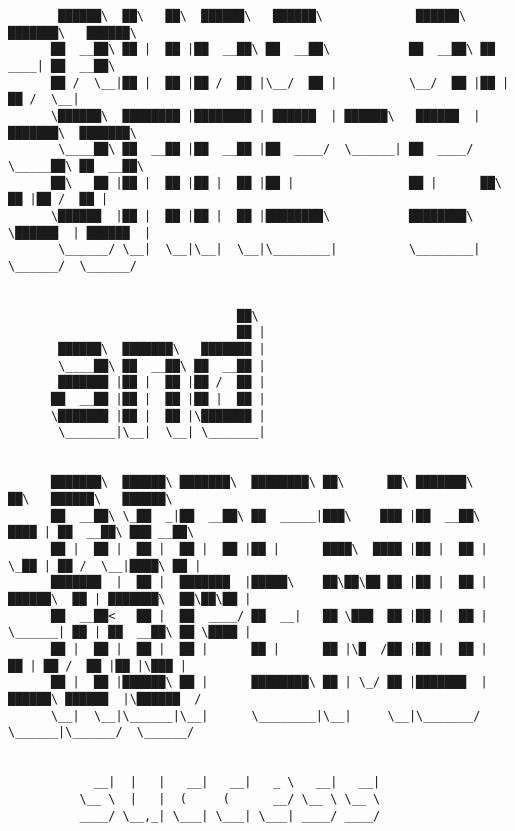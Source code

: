 \documentclass[varwidth=\maxdimen,margin=0.5cm,multi={verbatim}]{standalone}
\begin{document}
\begin{verbatim}
       ██████\  ██\   ██\  ██████\   ██████\             ██████\  ███████\   ██████\
      ██  __██\ ██ |  ██ |██  __██\ ██  __██\           ██  __██\ ██  ____| ██  __██\
      ██ /  \__|██ |  ██ |██ /  ██ |\__/  ██ |          \__/  ██ |██ |      ██ /  \__|
      \██████\  ████████ |████████ | ██████  | ██████\   ██████  |███████\  ███████\
       \____██\ ██  __██ |██  __██ |██  ____/  \______| ██  ____/ \_____██\ ██  __██\
      ██\   ██ |██ |  ██ |██ |  ██ |██ |                ██ |      ██\   ██ |██ /  ██ |
      \██████  |██ |  ██ |██ |  ██ |████████\           ████████\ \██████  | ██████  |
       \______/ \__|  \__|\__|  \__|\________|          \________| \______/  \______/


                                ██\
                                ██ |
       ██████\  ███████\   ███████ |
       \____██\ ██  __██\ ██  __██ |
       ███████ |██ |  ██ |██ /  ██ |
      ██  __██ |██ |  ██ |██ |  ██ |
      \███████ |██ |  ██ |\███████ |
       \_______|\__|  \__| \_______|


      ███████\  ██████\ ███████\  ████████\ ██\      ██\ ███████\            ██\   ██████\   ██████\
      ██  __██\ \_██  _|██  __██\ ██  _____|███\    ███ |██  __██\         ████ | ██  __██\ ███ __██\
      ██ |  ██ |  ██ |  ██ |  ██ |██ |      ████\  ████ |██ |  ██ |        \_██ | ██ /  \__|████\ ██ |
      ███████  |  ██ |  ███████  |█████\    ██\██\██ ██ |██ |  ██ | ██████\  ██ | ███████\  ██\██\██ |
      ██  __██<   ██ |  ██  ____/ ██  __|   ██ \███  ██ |██ |  ██ | \______| ██ | ██  __██\ ██ \████ |
      ██ |  ██ |  ██ |  ██ |      ██ |      ██ |\█  /██ |██ |  ██ |          ██ | ██ /  ██ |██ |\███ |
      ██ |  ██ |██████\ ██ |      ████████\ ██ | \_/ ██ |███████  |        ██████\ ██████  |\██████  /
      \__|  \__|\______|\__|      \________|\__|     \__|\_______/         \______|\______/  \______/


            __|  |   |   __|   __|   _ \   __|   __|
          \__ \  |   |  (     (      __/ \__ \ \__ \
          ____/ \__,_| \___| \___| \___| ____/ ____/




\end{verbatim}
\end{document}
